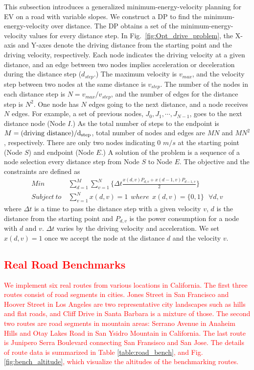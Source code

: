 \documentclass{IEEEtran}
\begin{document}
This subsection introduces a generalized minimum-energy-velocity planning for EV  on a road with variable slopes. We construct a DP to find the minimum-energy-velocity over distance. The DP obtains a set of the minimum-energy-velocity values for every distance step. In Fig.~\ref{fig:Opt_drive_problem}, the X-axis and Y-axes denote the driving distance from the starting point and the driving velocity, respectively. Each node indicates the driving velocity at a given distance, and an edge between two nodes implies acceleration or deceleration during the distance step ($d_{step}$.) The maximum velocity is $v_{max}$, and the velocity step between two nodes at the same distance is $v_{step}$. The number of the nodes in each distance step is $N = v_{max} / v_{step}$, and the number of edges for the distance step is $N^2$. One node has $N$ edges going to the next distance, and a node receives $N$ edges. For example, a set of previous nodes, $J_0, J_1, \cdots, J_{N-1}$, goes to the next distance node (Node $I$.) As the total number of steps to the endpoint is $M = (\rm driving~distance) / d_{step}$, total number of nodes and edges are $MN$ and $MN^2$, respectively. There are only two nodes indicating 0 $m/s$ at the starting point (Node $S$) and endpoint (Node $E$.) A solution of the problem is a sequence of a node selection every distance step from Node $S$ to Node $E$. The objective and the constraints are defined as
%
\begin{align} %
Min ~& \sum_{d=1}^{M}\sum_{v=1}^{N}\{\Delta t \frac{x(d,v)P_{d,v} + x(d-1,v)P_{d-1,v}}{2}\} \label{eq:objective}\\
Subject~to ~& \sum_{v=1}^{N}x(d,v) = 1~~where~~x(d,v) = \{0, 1\} ~~~\forall d, v \nonumber
\end{align}
%
where $\Delta t$ is a time to pass the distance step with a given velocity $v$, $d$ is the distance from the starting point and $P_{d,v}$ is the power consumption for a node with $d$ and $v$. $\Delta t$ varies by the driving velocity and acceleration. We set $x(d,v)=1$ once we accept the node at the distance $d$ and the velocity $v$.


\textcolor{red}{\subsection{Real Road Benchmarks}} \label{subsec:benchmarks}

\textcolor{red}{We implement six real routes from various locations in California. The first three routes consist of road segments in cities. Jones Street in San Francisco and Hoover Street in Los Angeles are two representative city landscapes such as hills and flat roads, and Cliff Drive in Santa Barbara is a mixture of those. The second two routes are road segments in mountain areas: Serrano Avenue in Anaheim Hills and Otay Lakes Road in San Ysidro Mountain in California. The last route is Junipero Serra Boulevard connecting San Fransisco and San Jose. The details of route data is summarized in Table \ref{table:road_bench}, and Fig. \ref{fig:bench_altitude}, which visualize the altitudes of the benchmarking routes.}
\end{document}
